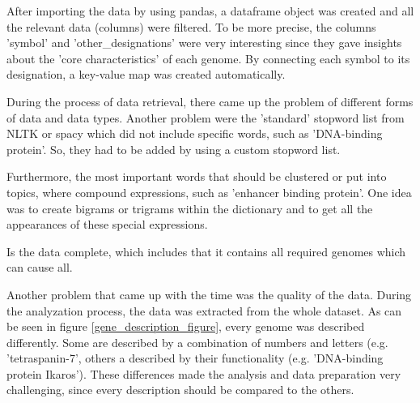 After importing the data by using pandas, a dataframe object was created and all the relevant data (columns) were filtered. To be more precise, the columns 'symbol' and 'other_designations' were very interesting since they gave insights about the 'core characteristics' of each genome. By connecting each symbol to its designation, a key-value map was created automatically.

During the process of data retrieval, there came up the problem of different forms of data and data types. 
Another problem were the 'standard' stopword list from NLTK or spacy which did not include specific words, such as 'DNA-binding protein'. So, they had to be added by using a custom stopword list.

Furthermore, the most important words that should be clustered or put into topics, where compound expressions, such as 'enhancer binding protein'. One idea was to create bigrams or trigrams within the dictionary and to get all the appearances of these special expressions.

Is the data complete, which includes that it contains all required genomes which can cause \gls{all}.

Another problem that came up with the time was the quality of the data. During the analyzation process, the data was extracted from the whole dataset. As can be seen in figure \ref{gene_description_figure}, every genome was described differently. Some are described by a combination of numbers and letters (e.g. 'tetraspanin-7', others a described by their functionality (e.g. 'DNA-binding protein Ikaros'). These differences made the analysis and data preparation very challenging, since every description should be compared to the others.

